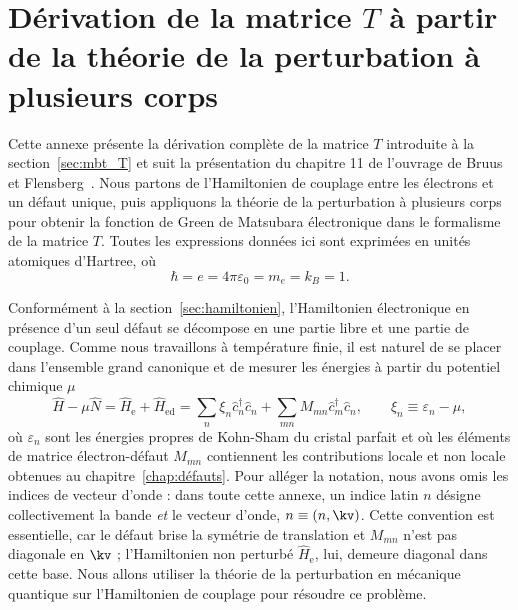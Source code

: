 \chapter{Dérivation de la matrice $T$ à partir de la théorie de la perturbation à plusieurs corps}\label{annexe:défauts}

Cette annexe présente la dérivation complète de la matrice $T$ introduite à la section~\ref{sec:mbt_T} et suit la présentation du chapitre 11 de l'ouvrage de Bruus et Flensberg~\cite{bruusManyBodyQuantumTheory2004}. Nous partons de l'Hamiltonien de couplage entre les électrons et un défaut unique, puis appliquons la théorie de la perturbation à plusieurs corps pour obtenir la fonction de Green de Matsubara électronique dans le formalisme de la matrice $T$. Toutes les expressions données ici sont exprimées en unités atomiques d'Hartree, où
\begin{equation}
    \hbar = e = 4\pi\varepsilon_0 = m_e = k_B = 1.
    \label{eqn:ad_unités_hartree}
\end{equation}

Conformément à la section~\ref{sec:hamiltonien}, l'Hamiltonien électronique en présence d'un seul défaut se décompose en une partie libre et une partie de couplage. Comme nous travaillons à température finie, il est naturel de se placer dans l'ensemble grand canonique et de mesurer les énergies à partir du potentiel chimique $\mu$
\begin{equation}
    \hat{H}-\mu\hat{N} = \hat{H}_\text{e}+\hat{H}_\text{ed} = \sum_{n}\xi_{n}\hat{c}^\dag_{n}\hat{c}_{n}+\sum_{mn}M_{mn}\hat{c}^\dag_{m}\hat{c}_{n},\qquad \xi_n\equiv\varepsilon_n-\mu,
    \label{eqn:ad_hamiltonien}
\end{equation}
où $\varepsilon_{n}$ sont les énergies propres de Kohn-Sham du cristal parfait et où les éléments de matrice électron-défaut $M_{mn}$ contiennent les contributions locale et non locale obtenues au chapitre~\ref{chap:défauts}. Pour alléger la notation, nous avons omis les indices de vecteur d'onde : dans toute cette annexe, un indice latin $n$ désigne collectivement la bande \emph{et} le vecteur d'onde, $n\equiv(n,\kv)$. Cette convention est essentielle, car le défaut brise la symétrie de translation et $M_{mn}$ n'est pas diagonale en $\kv$ ; l'Hamiltonien non perturbé $\hat{H}_\text{e}$, lui, demeure diagonal dans cette base. Nous allons utiliser la théorie de la perturbation en mécanique quantique sur l'Hamiltonien de couplage pour résoudre ce problème.

